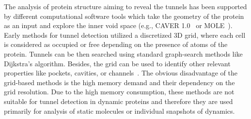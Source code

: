 \documentclass{llncs}
\begin{document}
The analysis of protein structure aiming to reveal the tunnels has been supported by different computational software tools which take the geometry of the protein as an input and explore the inner void space (e.g., CAVER 1.0~\cite{citeulike:6257975} or MOLE~\cite{Petrek20071357}). 
Early methods for tunnel detection utilized a discretized 3D grid, where each cell is considered as occupied or free depending
on the presence of atoms of the protein.
Tunnels can be then searched using standard graph-search methods like Dijkstra's algorithm.
Besides, the grid can be used to identify other relevant properties like 
pockets, cavities, or channels~\cite{sehnal2013mole,citeulike:6257975}.
The obvious disadvantage of the grid-based methods is the high memory demand and their dependency on the grid resolution.
Due to the high memory consumption, these methods are not suitable for tunnel detection in dynamic proteins and therefore they
are used primarily for analysis of static molecules or individual snapshots of dynamics.

\end{document}
